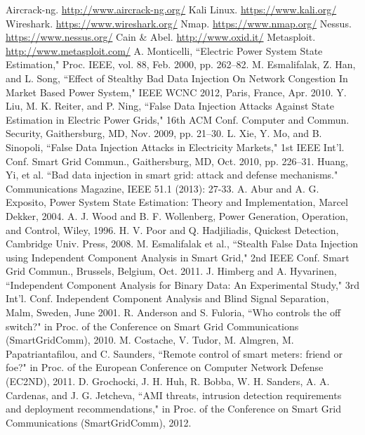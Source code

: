 \documentclass[11pt,oneside]{book}
\begin{document}
\begin{thebibliography}{99}
 Aircrack-ng. \url{http://www.aircrack-ng.org/}
 Kali Linux. \url{https://www.kali.org/}
 Wireshark. \url{https://www.wireshark.org/}
 Nmap. \url{https://www.nmap.org/}
 Nessus. \url{https://www.nessus.org/}
 Cain \& Abel. \url{http://www.oxid.it/}
 Metasploit. \url{http://www.metasploit.com/}
 A. Monticelli, ``Electric Power System State Estimation," Proc. IEEE, vol. 88, Feb. 2000, pp. 262–82.
 M. Esmalifalak, Z. Han, and L. Song, ``Effect of Stealthy Bad Data Injection On Network Congestion In Market Based Power System," IEEE WCNC 2012, Paris, France, Apr. 2010.
 Y. Liu, M. K. Reiter, and P. Ning, ``False Data Injection Attacks Against State Estimation in Electric Power Grids," 16th ACM Conf. Computer and Commun. Security, Gaithersburg, MD, Nov. 2009, pp. 21–30.
 L. Xie, Y. Mo, and B. Sinopoli, ``False Data Injection Attacks in Electricity Markets," 1st IEEE Int’l. Conf. Smart Grid Commun., Gaithersburg, MD, Oct. 2010, pp. 226–31.
 Huang, Yi, et al. ``Bad data injection in smart grid: attack and defense mechanisms." Communications Magazine, IEEE 51.1 (2013): 27-33.
 A. Abur and A. G. Exposito, Power System State Estimation: Theory and Implementation, Marcel Dekker, 2004.
 A. J. Wood and B. F. Wollenberg, Power Generation, Operation, and Control, Wiley, 1996.
 H. V. Poor and Q. Hadjiliadis, Quickest Detection, Cambridge Univ. Press, 2008.
 M. Esmalifalak et al., ``Stealth False Data Injection using Independent Component Analysis in Smart Grid," 2nd IEEE Conf. Smart Grid Commun., Brussels, Belgium, Oct. 2011.
 J. Himberg and A. Hyvarinen, ``Independent Component Analysis for Binary Data: An Experimental Study," 3rd Int’l. Conf. Independent Component Analysis and Blind Signal Separation, Malm, Sweden, June 2001.
 R. Anderson and S. Fuloria, ``Who controls the off switch?" in Proc. of the Conference on Smart Grid Communications (SmartGridComm), 2010.
 M. Costache, V. Tudor, M. Almgren, M. Papatriantafilou, and C. Saunders, ``Remote control of smart meters: friend or foe?" in Proc. of the European Conference on Computer Network Defense (EC2ND), 2011.
 D. Grochocki, J. H. Huh, R. Bobba, W. H. Sanders, A. A. Cardenas, and J. G. Jetcheva, ``AMI threats, intrusion detection requirements and deployment recommendations," in Proc. of the Conference on Smart Grid Communications (SmartGridComm), 2012.

\end{thebibliography}
\end{document}
